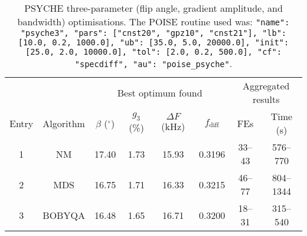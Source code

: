 \begin{table}
    \centering
    \begin{tabular}{cccccccc}
        \toprule
              &           & \multicolumn{4}{c}{Best optimum found} & \multicolumn{2}{c}{Aggregated results} \\
                            \cmidrule(lr){3-6}                     \cmidrule(lr){7-8}
        Entry & Algorithm & $\beta$ ($^\circ$) & $g_3$ (\%) & $\Delta F$ (\unit{\kHz}) & $f_\text{diff}$ & FEs    & Time (\unit{\s}) \\
        \midrule
        1     & NM        & 17.40              & 1.73       & 15.93                  & 0.3196          & 33--43 & 576--770             \\
        2     & MDS       & 16.75              & 1.71       & 16.33                  & 0.3215          & 46--77 & 804--1344            \\
        3     & BOBYQA    & 16.48              & 1.65       & 16.71                  & 0.3200          & 18--31 & 315--540             \\
        \bottomrule
    \end{tabular}
    \caption[PSYCHE three-parameter optimisations]{
        PSYCHE three-parameter (flip angle, gradient amplitude, and bandwidth) optimisations.
        The POISE routine used was: \texttt{{"name": "psyche3", "pars": ["cnst20", "gpz10", "cnst21"], "lb": [10.0, 0.2, 1000.0], "ub": [35.0, 5.0, 20000.0], "init": [25.0, 2.0, 10000.0], "tol": [2.0, 0.2, 500.0], "cf": "specdiff", "au": "poise_psyche"}}.
    }
    \label{tbl:poise_psyche3p}
\end{table}

